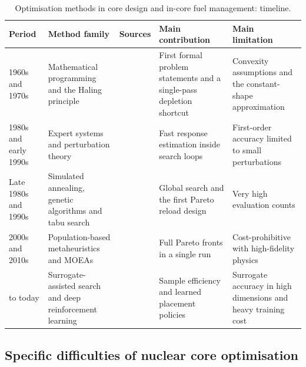 \begin{table}[htbp]
  \centering
  \caption{Optimisation methods in core design and in-core fuel management: timeline.}
  \label{tab:lit-opt-timeline}
  \footnotesize
  \begin{tabular}{@{}>{\raggedright\arraybackslash}p{}>{\raggedright\arraybackslash}p{}%
                  >{\raggedright\arraybackslash}p{}>{\raggedright\arraybackslash}p{}>{\raggedright\arraybackslash}p{}@{}}
    \toprule
    Period & Method family & Sources & Main contribution &
    Main limitation \\
    \midrule
    1960s and 1970s &
    Mathematical programming and the Haling principle &
    \cite{meneses_2010,downar_1988} &
    First formal problem statements and a single-pass depletion
    shortcut &
    Convexity assumptions and the constant-shape approximation \\
    \addlinespace
    1980s and early 1990s &
    Expert systems and perturbation theory &
    \cite{hobson_turinsky_1986,meneses_2010,rozon_beaudet_1992} &
    Fast response estimation inside search loops &
    First-order accuracy limited to small perturbations \\
    \addlinespace
    Late 1980s and 1990s &
    Simulated annealing, genetic algorithms and tabu search &
    \cite{kropaczek_turinsky_1991,maldonado_1995,parks_1996,meneses_2010} &
    Global search and the first Pareto reload design &
    Very high evaluation counts \\
    \addlinespace
    2000s and 2010s &
    Population-based metaheuristics and MOEAs &
    \cite{deb_nsga2_2002} &
    Full Pareto fronts in a single run &
    Cost-prohibitive with high-fidelity physics \\
    \addlinespace
    2019 to today &
    Surrogate-assisted search and deep reinforcement learning &
    \cite{whyte_2020,seurin_2024_pearl} &
    Sample efficiency and learned placement policies &
    Surrogate accuracy in high dimensions and heavy training cost \\
    \bottomrule
  \end{tabular}
\end{table}

\subsection{Specific difficulties of nuclear core optimisation}
\label{sec:lit-opt-difficulties}

